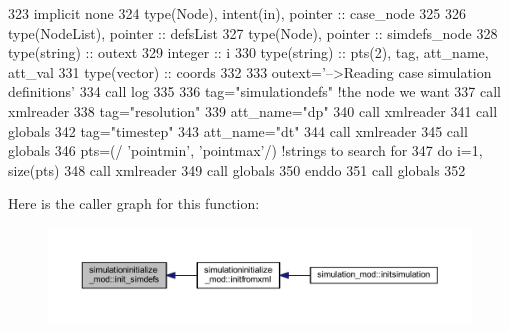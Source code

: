 \begin{DoxyCode}
323     \textcolor{keywordtype}{implicit none}
324     \textcolor{keywordtype}{type}(Node), \textcolor{keywordtype}{intent(in)}, \textcolor{keywordtype}{pointer} :: case\_node
325 
326     \textcolor{keywordtype}{type}(NodeList), \textcolor{keywordtype}{pointer} :: defsList
327     \textcolor{keywordtype}{type}(Node), \textcolor{keywordtype}{pointer} :: simdefs\_node
328     \textcolor{keywordtype}{type}(string) :: outext
329     \textcolor{keywordtype}{integer} :: i
330     \textcolor{keywordtype}{type}(string) :: pts(2), tag, att\_name, att\_val
331     \textcolor{keywordtype}{type}(vector) :: coords
332 
333     outext=\textcolor{stringliteral}{'-->Reading case simulation definitions'}
334     \textcolor{keyword}{call }log%
335 
336     tag=\textcolor{stringliteral}{"simulationdefs"}    \textcolor{comment}{!the node we want}
337     \textcolor{keyword}{call }xmlreader%
338     tag=\textcolor{stringliteral}{"resolution"}
339     att\_name=\textcolor{stringliteral}{"dp"}
340     \textcolor{keyword}{call }xmlreader%
341     \textcolor{keyword}{call }globals%
342     tag=\textcolor{stringliteral}{"timestep"}
343     att\_name=\textcolor{stringliteral}{"dt"}
344     \textcolor{keyword}{call }xmlreader%
345     \textcolor{keyword}{call }globals%
346     pts=(/ \textcolor{stringliteral}{'pointmin'}, \textcolor{stringliteral}{'pointmax'}/) \textcolor{comment}{!strings to search for}
347     \textcolor{keywordflow}{do} i=1, \textcolor{keyword}{size}(pts)
348         \textcolor{keyword}{call }xmlreader%
349         \textcolor{keyword}{call }globals%
350 \textcolor{keywordflow}{    enddo}
351     \textcolor{keyword}{call }globals%
352 
\end{DoxyCode}
Here is the caller graph for this function\+:\nopagebreak
\begin{figure}[H]
\begin{center}
\leavevmode
\includegraphics[width=350pt]{namespacesimulationinitialize__mod_af6b2508d52e9e29aeb6e7dfbabd88e8d_icgraph}
\end{center}
\end{figure}
\mbox{\label{namespacesimulationinitialize__mod_acaa6b217159e3a10e7db04dd7b0e4058}} 
